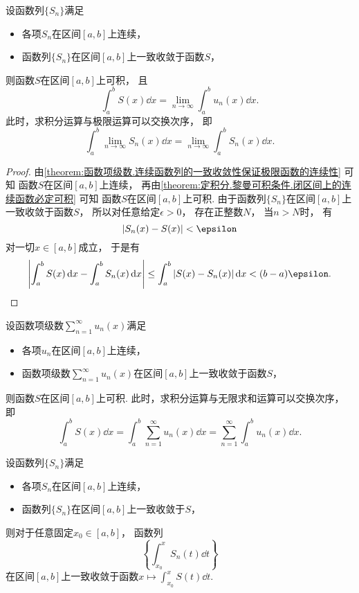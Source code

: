 \begin{theorem}\label{theorem:函数项级数.连续函数列的一致收敛性保证极限函数的可积性}
设函数列\(\{S_n\}\)满足\begin{itemize}
	\item 各项\(S_n\)在区间\([a,b]\)上连续，
	\item 函数列\(\{S_n\}\)在区间\([a,b]\)上一致收敛于函数\(S\)，
\end{itemize}
则函数\(S\)在区间\([a,b]\)上可积，
且\[
	\int_a^b S(x) \dd{x}
	= \lim_{n\to\infty} \int_a^b u_n(x) \dd{x}.
\]
此时，求积分运算与极限运算可以交换次序，
即\[
	\int_a^b \lim_{n\to\infty} S_n(x) \dd{x}
	= \lim_{n\to\infty} \int_a^b S_n(x) \dd{x}.
\]
\begin{proof}
由\cref{theorem:函数项级数.连续函数列的一致收敛性保证极限函数的连续性} 可知
函数\(S\)在区间\([a,b]\)上连续，
再由\cref{theorem:定积分.黎曼可积条件.闭区间上的连续函数必定可积} 可知
函数\(S\)在区间\([a,b]\)上可积.
由于函数列\(\{S_n\}\)在区间\([a,b]\)上一致收敛于函数\(S\)，
所以对任意给定\(\epsilon>0\)，
存在正整数\(N\)，
当\(n>N\)时，
有\[
	\abs{S_n(x) - S(x)} < \epsilon
\]对一切\(x\in[a,b]\)成立，
于是有\[
	\abs{\int_a^b S(x) \dd{x} - \int_a^b S_n(x) \dd{x}}
	\leq \int_a^b \abs{S(x) - S_n(x)} \dd{x}
	< (b-a) \epsilon.
	\qedhere
\]
\end{proof}
\end{theorem}
\begin{theorem}
设函数项级数\(\sum_{n=1}^\infty u_n(x)\)满足\begin{itemize}
	\item 各项\(u_n\)在区间\([a,b]\)上连续，
	\item 函数项级数\(\sum_{n=1}^\infty u_n(x)\)在区间\([a,b]\)上一致收敛于函数\(S\)，
\end{itemize}
则函数\(S\)在区间\([a,b]\)上可积.
此时，求积分运算与无限求和运算可以交换次序，
即\[
	\int_a^b S(x) \dd{x}
	= \int_a^b \sum_{n=1}^\infty u_n(x) \dd{x}
	= \sum_{n=1}^\infty \int_a^b u_n(x) \dd{x}.
\]
\end{theorem}
\begin{proposition}
设函数列\(\{S_n\}\)满足\begin{itemize}
	\item 各项\(S_n\)在区间\([a,b]\)上连续，
	\item 函数列\(\{S_n\}\)在区间\([a,b]\)上一致收敛于\(S\)，
\end{itemize}
则对于任意固定\(x_0\in[a,b]\)，
函数列\[
	\left\{\int_{x_0}^x S_n(t) \dd{t}\right\}
\]在区间\([a,b]\)上一致收敛于函数\(x \mapsto \int_{x_0}^x S(t) \dd{t}\).
\end{proposition}
